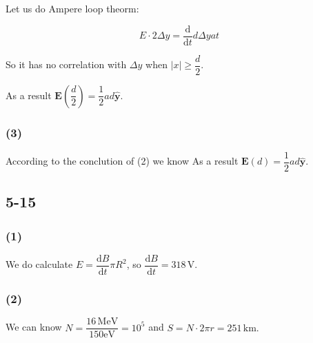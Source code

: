\documentclass[a4paper,11pt]{amsart}
\theoremstyle{definition}
\begin{document}
	Let us do Ampere loop theorm:
	
	$$
	E\cdot2\Delta y=\dfrac{\mathrm{d}}{\mathrm{d}t}d\Delta yat
	$$
	
	So it has no correlation with $\Delta y$ when $|x|\geqslant\dfrac{d}{2}.$
	
	As a result $\bm{E}\left(\dfrac{d}{2}\right)=\dfrac{1}{2}ad\bm{\hat{y}}$.
	
	\subsubsection*{(3)}
	
	According to the conclution of (2) we know As a result $\bm{E}(d)=\dfrac{1}{2}ad\bm{\hat{y}}$.
	
	\subsection*{5-15}
	
	\subsubsection*{(1)}
	
	We do calculate $E=\dfrac{\mathrm{d}B}{\mathrm{d}t}\pi R^2$, so $\dfrac{\mathrm{d}B}{\mathrm{d}t}=318\,\mathrm{V}.$
	
	\subsubsection*{(2)}
	
	We can know $N=\dfrac{16\,\mathrm{MeV}}{150\mathrm{eV}}=10^5$ and $S=N\cdot2\pi r=251\,\mathrm{km}.$
	
\end{document}

